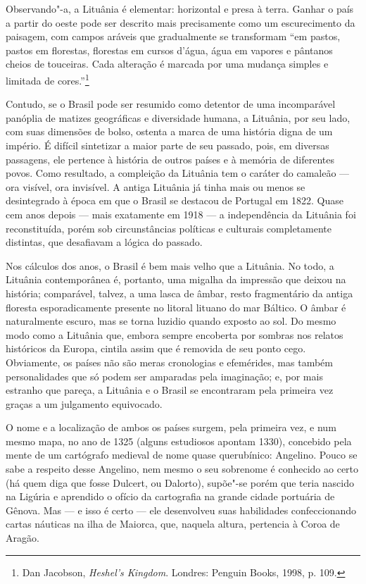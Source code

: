 Observando"-a, a Lituânia é elementar: horizontal e presa à terra.
Ganhar o país a partir do oeste pode ser descrito mais precisamente como
um escurecimento da paisagem, com campos aráveis que gradualmente se
transformam ``em pastos, pastos em florestas, florestas em cursos d'água, 
água em vapores e pântanos cheios de touceiras. Cada alteração é
marcada por uma mudança simples e limitada de cores.''\footnote{Dan Jacobson, \textit{Heshel's Kingdom}. Londres: Penguin Books, 1998, p. 109.}

Contudo, se o Brasil pode ser resumido como detentor de uma incomparável
panóplia de matizes geográficas e diversidade humana, a Lituânia, por
seu lado, com suas dimensões de bolso, ostenta a marca de uma história
digna de um império. É difícil sintetizar a maior parte de seu passado,
pois, em diversas passagens, ele pertence à história de outros
países e à memória de diferentes povos. Como resultado, a compleição da
Lituânia tem o caráter do camaleão --- ora visível, ora invisível. A
antiga Lituânia já tinha mais ou menos se desintegrado à época em que o
Brasil se destacou de Portugal em 1822. Quase cem anos depois --- mais
exatamente em 1918 --- a independência da Lituânia foi reconstituída,
porém sob circunstâncias políticas e culturais completamente distintas,
que desafiavam a lógica do passado. 

Nos cálculos dos anos, o Brasil é
bem mais velho que a Lituânia. No todo, a Lituânia contemporânea é,
portanto, uma migalha da impressão que deixou na história; comparável,
talvez, a uma lasca de âmbar, resto fragmentário da antiga floresta
esporadicamente presente no litoral lituano do mar Báltico. O âmbar é
naturalmente escuro, mas se torna luzidio quando exposto ao sol. Do
mesmo modo como a Lituânia que, embora sempre encoberta por sombras nos
relatos históricos da Europa, cintila assim que é removida de seu ponto
cego. Obviamente, os países não são meras cronologias e efemérides, mas
também personalidades que só podem ser amparadas pela imaginação; e, por
mais estranho que pareça, a Lituânia e o Brasil se encontraram pela
primeira vez graças a um julgamento equivocado.

O nome e a localização de ambos os países surgem, pela primeira vez, e
num mesmo mapa, no ano de 1325 (alguns estudiosos apontam 1330),
concebido pela mente de um cartógrafo medieval de nome quase
querubínico: Angelino. Pouco se sabe a respeito desse Angelino, nem
mesmo o seu sobrenome é conhecido ao certo (há quem diga que fosse
Dulcert, ou Dalorto), supõe"-se porém que teria nascido na Ligúria e
aprendido o ofício da cartografia na grande cidade portuária de Gênova.
Mas --- e isso é certo --- ele desenvolveu suas habilidades confeccionando
cartas náuticas na ilha de Maiorca, que, naquela altura, pertencia à
Coroa de Aragão. 

